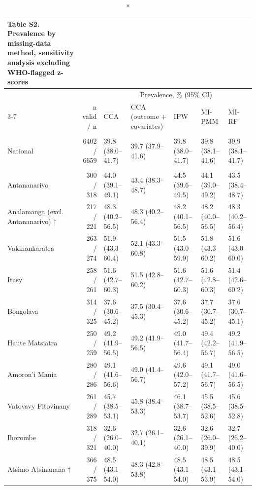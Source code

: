 \begingroup
\fontsize{8.0pt}{10.0pt}\selectfont
\setlength{\LTpost}{0mm}
\begin{longtable}{l|rlllll}
\caption*{
{\fontsize{20}{25}\selectfont  Table S2. Prevalence by missing-data method, sensitivity analysis excluding WHO-flagged z-scores\fontsize{8}{10}\selectfont }
} \\ 
\toprule
 &  & \multicolumn{5}{c}{{Prevalence, \% (95\% CI)}} \\ 
\cmidrule(lr){3-7}
 & n valid / n & CCA & CCA (outcome + covariates) & IPW & MI-PMM & MI-RF \\ 
\midrule\endhead\addlinespace[2.5pt]
\multicolumn{7}{l}{Stunting — National} \\[2.5pt] 
\midrule\addlinespace[2.5pt]
National & 6402 / 6659 & 39.8 (38.0–41.7) & 39.7 (37.9–41.6) & 39.8 (38.0–41.7) & 39.8 (38.1–41.6) & 39.9 (38.1–41.7) \\ 
\midrule\addlinespace[2.5pt]
\multicolumn{7}{l}{Stunting — Region} \\[2.5pt] 
\midrule\addlinespace[2.5pt]
Antananarivo & 300 / 318 & 44.0 (39.1–49.1) & 43.4 (38.3–48.7) & 44.5 (39.6–49.5) & 44.1 (39.0–49.2) & 43.5 (38.4–48.7) \\ 
Analamanga (excl. Antananarivo) † & 217 / 221 & 48.3 (40.2–56.5) & 48.3 (40.2–56.4) & 48.2 (40.1–56.5) & 48.2 (40.0–56.5) & 48.3 (40.2–56.4) \\ 
Vakinankaratra & 263 / 274 & 51.9 (43.3–60.4) & 52.1 (43.3–60.8) & 51.5 (43.0–59.9) & 51.8 (43.3–60.2) & 51.6 (43.0–60.0) \\ 
Itasy & 258 / 261 & 51.6 (42.7–60.3) & 51.5 (42.8–60.2) & 51.6 (42.7–60.3) & 51.6 (42.8–60.3) & 51.4 (42.6–60.2) \\ 
Bongolava & 314 / 325 & 37.6 (30.6–45.2) & 37.5 (30.4–45.3) & 37.6 (30.6–45.2) & 37.7 (30.7–45.2) & 37.6 (30.7–45.1) \\ 
Haute Matsiatra & 250 / 259 & 49.2 (41.9–56.5) & 49.2 (41.9–56.5) & 49.0 (41.7–56.4) & 49.4 (42.2–56.7) & 49.2 (41.9–56.5) \\ 
Amoron'i Mania & 280 / 286 & 49.1 (41.6–56.6) & 49.0 (41.4–56.7) & 49.6 (42.0–57.2) & 49.1 (41.7–56.7) & 49.0 (41.6–56.5) \\ 
Vatovavy Fitovinany & 261 / 289 & 45.7 (38.5–53.1) & 45.8 (38.4–53.3) & 46.1 (38.7–53.7) & 45.5 (38.5–52.6) & 45.6 (38.5–52.8) \\ 
Ihorombe & 318 / 321 & 32.6 (26.0–40.0) & 32.7 (26.1–40.1) & 32.6 (26.1–40.0) & 32.6 (26.0–39.9) & 32.7 (26.2–40.0) \\ 
Atsimo Atsinanana † & 366 / 375 & 48.5 (43.1–54.0) & 48.3 (42.8–53.8) & 48.5 (43.1–54.0) & 48.5 (43.1–53.9) & 48.5 (43.1–54.0) \\ 

\end{longtable}
